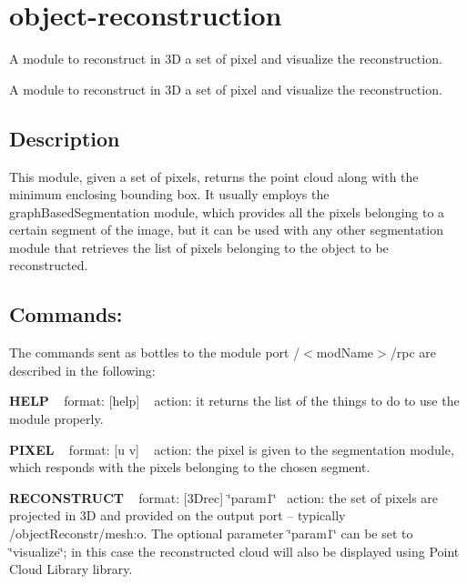 \section{object-\/reconstruction}
\label{group__object-reconstruction}


A module to reconstruct in 3\+D a set of pixel and visualize the reconstruction.  


A module to reconstruct in 3\+D a set of pixel and visualize the reconstruction. 

\hypertarget{group__handIKModule_intro_sec}{}\subsection{Description}\label{group__handIKModule_intro_sec}
This module, given a set of pixels, returns the point cloud along with the minimum enclosing bounding box. It usually employs the graph\+Based\+Segmentation module, which provides all the pixels belonging to a certain segment of the image, but it can be used with any other segmentation module that retrieves the list of pixels belonging to the object to be reconstructed.\hypertarget{group__handIKModule_rpc_port}{}\subsection{Commands\+:}\label{group__handIKModule_rpc_port}
The commands sent as bottles to the module port /$<$mod\+Name$>$/rpc are described in the following\+:

{\bfseries H\+E\+L\+P} ~\newline
format\+: \mbox{[}help\mbox{]} ~\newline
action\+: it returns the list of the things to do to use the module properly.

{\bfseries P\+I\+X\+E\+L} ~\newline
format\+: \mbox{[}u v\mbox{]} ~\newline
action\+: the pixel is given to the segmentation module, which responds with the pixels belonging to the chosen segment.

{\bfseries R\+E\+C\+O\+N\+S\+T\+R\+U\+C\+T} ~\newline
format\+: \mbox{[}3\+Drec\mbox{]} \char`\"{}param1\char`\"{}~\newline
action\+: the set of pixels are projected in 3\+D and provided on the output port -- typically /object\+Reconstr/mesh\+:o. The optional parameter \char`\"{}param1\char`\"{} can be set to \char`\"{}visualize\char`\"{}; in this case the reconstructed cloud will also be displayed using Point Cloud Library library.

